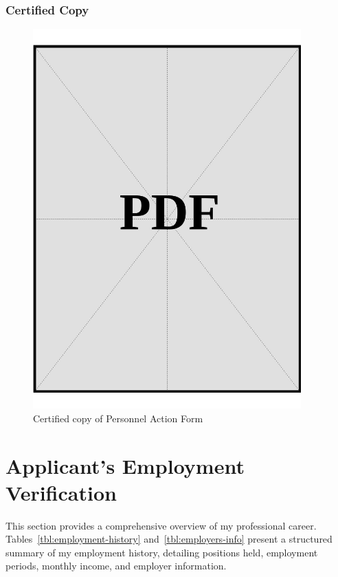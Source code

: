 \clearpage

\subsubsection*{Certified Copy}

\vspace*{\fill}
\begin{figure}[H]
    \centering
    \includegraphics[width=0.92\textwidth]{../docs/sponsor/employment/employment-letter-certified-copy.pdf}
    \caption{Certified copy of Personnel Action Form}
    \label{fig:paf-certified-copy}
\end{figure}
\vspace*{\fill}
\clearpage


\section{Applicant's Employment Verification}

This section provides a comprehensive overview of my professional career. Tables~\ref{tbl:employment-history} and~\ref{tbl:employers-info} present a structured summary of my employment history, detailing positions held, employment periods, monthly income, and employer information.

